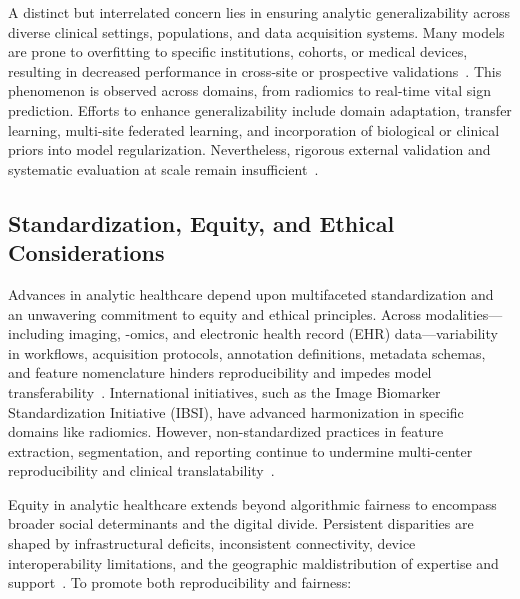 A distinct but interrelated concern lies in ensuring analytic generalizability across diverse clinical settings, populations, and data acquisition systems. Many models are prone to overfitting to specific institutions, cohorts, or medical devices, resulting in decreased performance in cross-site or prospective validations~\cite{ref28, ref32, ref53, ref65, ref73, ref98, ref106}. This phenomenon is observed across domains, from radiomics to real-time vital sign prediction. Efforts to enhance generalizability include domain adaptation, transfer learning, multi-site federated learning, and incorporation of biological or clinical priors into model regularization. Nevertheless, rigorous external validation and systematic evaluation at scale remain insufficient~\cite{ref28, ref70, ref73, ref78, ref80, ref98, ref99, ref106}.

\subsection{Standardization, Equity, and Ethical Considerations}

Advances in analytic healthcare depend upon multifaceted standardization and an unwavering commitment to equity and ethical principles. Across modalities—including imaging, -omics, and electronic health record (EHR) data—variability in workflows, acquisition protocols, annotation definitions, metadata schemas, and feature nomenclature hinders reproducibility and impedes model transferability~\cite{ref44,ref45,ref46,ref50,ref54,ref55,ref60,ref61,ref62,ref63,ref64,ref65,ref74,ref75,ref78,ref5,ref44,ref46,ref50,ref54,ref53,ref55,ref61,ref62,ref64,ref65,ref66,ref67,ref71,ref72,ref74,ref75,ref76,ref78,ref79,ref80,ref84,ref90,ref106}. International initiatives, such as the Image Biomarker Standardization Initiative (IBSI), have advanced harmonization in specific domains like radiomics. However, non-standardized practices in feature extraction, segmentation, and reporting continue to undermine multi-center reproducibility and clinical translatability~\cite{ref46,ref54,ref55,ref65,ref74,ref75,ref78,ref90,ref106}.

Equity in analytic healthcare extends beyond algorithmic fairness to encompass broader social determinants and the digital divide. Persistent disparities are shaped by infrastructural deficits, inconsistent connectivity, device interoperability limitations, and the geographic maldistribution of expertise and support~\cite{ref61,ref63,ref65,ref69,ref78,ref79,ref82,ref84,ref85,ref90,ref106}. To promote both reproducibility and fairness:

